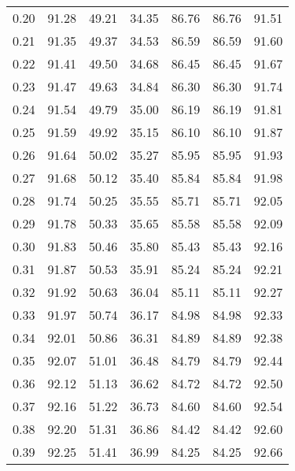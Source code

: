 \begin{tabular}{|c|c|c|c|c|c|c|}
      0.20 &     91.28 &     49.21 &      34.35 &   86.76 &      86.76 &         91.51 \\
      0.21 &     91.35 &     49.37 &      34.53 &   86.59 &      86.59 &         91.60 \\
      0.22 &     91.41 &     49.50 &      34.68 &   86.45 &      86.45 &         91.67 \\
      0.23 &     91.47 &     49.63 &      34.84 &   86.30 &      86.30 &         91.74 \\
      0.24 &     91.54 &     49.79 &      35.00 &   86.19 &      86.19 &         91.81 \\
      0.25 &     91.59 &     49.92 &      35.15 &   86.10 &      86.10 &         91.87 \\
      0.26 &     91.64 &     50.02 &      35.27 &   85.95 &      85.95 &         91.93 \\
      0.27 &     91.68 &     50.12 &      35.40 &   85.84 &      85.84 &         91.98 \\
      0.28 &     91.74 &     50.25 &      35.55 &   85.71 &      85.71 &         92.05 \\
      0.29 &     91.78 &     50.33 &      35.65 &   85.58 &      85.58 &         92.09 \\
      0.30 &     91.83 &     50.46 &      35.80 &   85.43 &      85.43 &         92.16 \\
      0.31 &     91.87 &     50.53 &      35.91 &   85.24 &      85.24 &         92.21 \\
      0.32 &     91.92 &     50.63 &      36.04 &   85.11 &      85.11 &         92.27 \\
      0.33 &     91.97 &     50.74 &      36.17 &   84.98 &      84.98 &         92.33 \\
      0.34 &     92.01 &     50.86 &      36.31 &   84.89 &      84.89 &         92.38 \\
      0.35 &     92.07 &     51.01 &      36.48 &   84.79 &      84.79 &         92.44 \\
      0.36 &     92.12 &     51.13 &      36.62 &   84.72 &      84.72 &         92.50 \\
      0.37 &     92.16 &     51.22 &      36.73 &   84.60 &      84.60 &         92.54 \\
      0.38 &     92.20 &     51.31 &      36.86 &   84.42 &      84.42 &         92.60 \\
      0.39 &     92.25 &     51.41 &      36.99 &   84.25 &      84.25 &         92.66 \\

\end{tabular}
